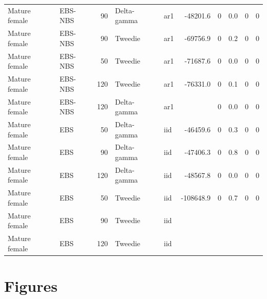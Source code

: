 \documentclass[
]{article}
\begin{document}
\begin{table}
{\begin{tabular}[t]{llrllrrrrr}
Mature female & EBS-NBS & 90 & Delta-gamma & ar1 & -48201.6 & 0 & 0.0 & 0 & 0\\
Mature female & EBS-NBS & 90 & Tweedie & ar1 & -69756.9 & 0 & 0.2 & 0 & 0\\
\addlinespace
Mature female & EBS-NBS & 50 & Tweedie & ar1 & -71687.6 & 0 & 0.0 & 0 & 0\\
Mature female & EBS-NBS & 120 & Tweedie & ar1 & -76331.0 & 0 & 0.1 & 0 & 0\\
Mature female & EBS-NBS & 120 & Delta-gamma & ar1 &  & 0 & 0.0 & 0 & 0\\
Mature female & EBS & 50 & Delta-gamma & iid & -46459.6 & 0 & 0.3 & 0 & 0\\
Mature female & EBS & 90 & Delta-gamma & iid & -47406.3 & 0 & 0.8 & 0 & 0\\
\addlinespace
Mature female & EBS & 120 & Delta-gamma & iid & -48567.8 & 0 & 0.0 & 0 & 0\\
Mature female & EBS & 50 & Tweedie & iid & -108648.9 & 0 & 0.7 & 0 & 0\\
Mature female & EBS & 90 & Tweedie & iid &  &  &  &  & \\
Mature female & EBS & 120 & Tweedie & iid &  &  &  &  & \\
\bottomrule
\end{tabular}}
\end{table}

\clearpage

\section*{Figures}\label{figures}
\end{document}
